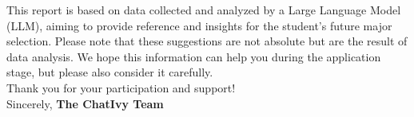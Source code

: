 \documentclass[12pt]{article}
\begin{document}
\begin{CJK*}{UTF8}{gbsn}
\bigskip
\bigskip
\bigskip
\noindent This report is based on data collected and analyzed by a Large Language Model (LLM), aiming to provide reference and insights for the student's future major selection. Please note that these suggestions are not absolute but are the result of data analysis. We hope this information can help you during the application stage, but please also consider it carefully. \\[10mm]

\noindent Thank you for your participation and support! \\[10mm]

\noindent Sincerely,
\bigskip
\bigskip
\noindent \textbf{The ChatIvy Team}
\printbibliography
\clearpage
\end{CJK*}
\end{document}

